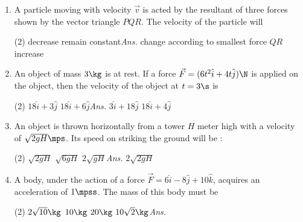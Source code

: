 \documentclass{article}
\newcommand{\ans}{\textcolor{red!95}{\textit{\quad Ans.}}}
\begin{document}
\begin{enumerate}
\item A particle moving with velocity $\vec{v}$ is acted by the resultant of three forces shown by the vector triangle $PQR$. The velocity of the particle will 
\begin{center}
\end{center}
\begin{tasks}(2)
	\task decrease
	\task remain constant\ans
	\task change according to smallest force $QR$
	\task increase
\end{tasks}

\item An object of mass $3\kg$ is at rest. If a force $\vec{F}=(6t^2\hat{i}+4t\hat{j})\N$ is applied on the object, then the velocity of the object at $t=3\s$ is
\begin{tasks}(2)
	\task $18\hat{i}+3\hat{j}$
	\task $18\hat{i}+6\hat{j}$\ans
	\task $3\hat{i}+18\hat{j}$
	\task $18\hat{i}+4\hat{j}$
\end{tasks}

\item An object is thrown horizontally from a tower $H$ meter high with a velocity of $\sqrt{2gH} \mps$. Its speed on striking the ground will be :
\begin{center}
	\end{center}
\begin{tasks}(2)
\task $\sqrt{2gH}$
\task $\sqrt{6gH}$
\task $2\sqrt{gH}$\ans
\task $2\sqrt{2gH}$
\end{tasks}

\item A body, under the action of a force $\vec{F}=6\hat{i}-8\hat{j}+10\hat{k}$, acquires an acceleration of $1\mpss$. The mass of this body must be
\begin{tasks}(2)
	\task $2\sqrt{10}\kg$
	\task $10\kg$
	\task $20\kg$
	\task $10\sqrt{2}\kg$\ans
\end{tasks}


\end{enumerate}
\end{document}
